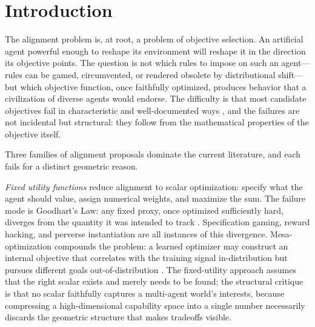 %
%
%

\section{Introduction}
\label{sec:introduction}

The alignment problem is, at root, a problem of objective selection. An
artificial agent powerful enough to reshape its environment will reshape it in
the direction its objective points. The question is not which rules to impose
on such an agent---rules can be gamed, circumvented, or rendered obsolete by
distributional shift---but which objective function, once faithfully optimized,
produces behavior that a civilization of diverse agents would endorse. The
difficulty is that most candidate objectives fail in characteristic and
well-documented ways \citep{amodei2016concrete, ngo2022alignment}, and the
failures are not incidental but structural: they follow from the mathematical
properties of the objective itself.

Three families of alignment proposals dominate the current literature, and each
fails for a distinct geometric reason.

\emph{Fixed utility functions} reduce alignment to scalar optimization: specify
what the agent should value, assign numerical weights, and maximize the sum.
The failure mode is Goodhart's Law: any fixed proxy, once optimized
sufficiently hard, diverges from the quantity it was intended to track
\citep{bostrom2014superintelligence, manheim2018categorizing}. Specification
gaming, reward hacking, and perverse instantiation are all instances of this
divergence. Mesa-optimization compounds the problem: a learned optimizer may
construct an internal objective that correlates with the training signal
in-distribution but pursues different goals out-of-distribution
\citep{hubinger2019risks}. The fixed-utility approach assumes that the right
scalar exists and merely needs to be found; the structural critique is that no
scalar faithfully captures a multi-agent world's interests, because compressing
a high-dimensional capability space into a single number necessarily discards
the geometric structure that makes tradeoffs visible.

